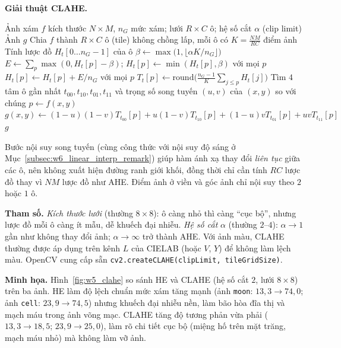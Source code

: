 \textbf{Giải thuật CLAHE.}
\begin{algorithm}[ht]
\caption{CLAHE}
\label{alg:w5_clahe}
\begin{algorithmic}[1]
\Require Ảnh xám $f$ kích thước $N \times M$, $n_G$ mức xám; lưới $R \times C$ ô; hệ số cắt $\alpha$ (clip limit)
\Ensure Ảnh $g$
\State Chia $f$ thành $R \times C$ ô (tile) không chồng lấp, mỗi ô có $K = \frac{NM}{RC}$ điểm ảnh
    \State Tính lược đồ $H_t[0 \ldots n_G - 1]$ của ô
    \State $\beta \gets \max\!\big(1, \lfloor \alpha K / n_G \rfloor\big)$ 
    \State $E \gets \sum_p \max(0, H_t[p] - \beta)$; \quad $H_t[p] \gets \min(H_t[p], \beta)$ với mọi $p$
    \State $H_t[p] \gets H_t[p] + E / n_G$ với mọi $p$ 
    \State $T_t[p] \gets \mathrm{round}\!\big(\frac{n_G - 1}{K}\sum_{j \le p} H_t[j]\big)$ 
\EndFor
{}
    \State Tìm $4$ tâm ô gần nhất $t_{00}, t_{10}, t_{01}, t_{11}$ và trọng số song tuyến $(u, v)$ của $(x, y)$ so với chúng
    \State $p \gets f(x, y)$
    \State $g(x, y) \gets (1 - u)(1 - v)T_{t_{00}}[p] + u(1 - v)T_{t_{10}}[p] + (1 - u)vT_{t_{01}}[p] + uvT_{t_{11}}[p]$
\EndFor
\State \Return $g$
\end{algorithmic}
\end{algorithm}

Bước nội suy song tuyến (cùng công thức với nội suy độ sáng ở Mục~\ref{subsec:w6_linear_interp_remark}) giúp hàm ánh xạ thay đổi \emph{liên tục} giữa các ô, nên không xuất hiện đường ranh giới khối, đồng thời chỉ cần tính $RC$ lược đồ thay vì $NM$ lược đồ như AHE. Điểm ảnh ở viền và góc ảnh chỉ nội suy theo $2$ hoặc $1$ ô.

\textbf{Tham số.} \emph{Kích thước lưới} (thường $8 \times 8$): ô càng nhỏ thì càng ``cục bộ'', nhưng lược đồ mỗi ô càng ít mẫu, dễ khuếch đại nhiễu. \emph{Hệ số cắt} $\alpha$ (thường $2$--$4$): $\alpha \to 1$ gần như không thay đổi ảnh; $\alpha \to \infty$ trở thành AHE. Với ảnh màu, CLAHE thường được áp dụng trên kênh $L$ của CIELAB (hoặc $V$, $Y$) để không làm lệch màu. OpenCV cung cấp sẵn \texttt{cv2.createCLAHE(clipLimit, tileGridSize)}.

\textbf{Minh họa.} Hình~\ref{fig:w5_clahe} so sánh HE và CLAHE (hệ số cắt $2$, lưới $8 \times 8$) trên ba ảnh. HE làm độ lệch chuẩn mức xám tăng mạnh (ảnh \texttt{moon}: $13{,}3 \to 74{,}0$; ảnh \texttt{cell}: $23{,}9 \to 74{,}5$) nhưng khuếch đại nhiễu nền, làm bão hòa đĩa thị và mạch máu trong ảnh võng mạc. CLAHE tăng độ tương phản vừa phải ($13{,}3 \to 18{,}5$; $23{,}9 \to 25{,}0$), làm rõ chi tiết cục bộ (miệng hố trên mặt trăng, mạch máu nhỏ) mà không làm vỡ ảnh.

